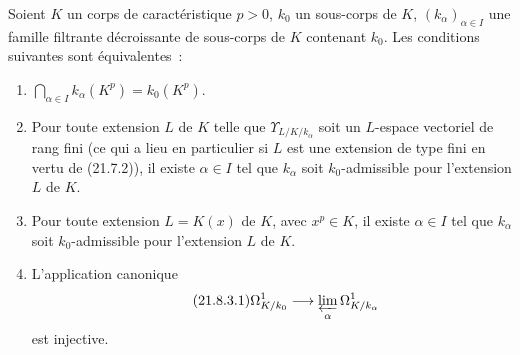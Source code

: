 \begin{theorem}[21.8.3]
\label{0.21.8.3-fr}
Soient $K$ un corps de caractéristique $p>0$, $k_0$ un sous-corps de $K$,
$(k_\alpha)_{\alpha\in I}$ une famille filtrante décroissante de sous-corps
de $K$ contenant $k_0$. Les conditions suivantes sont équivalentes~:
\begin{enumerate}
  \item[\rm a)] $\bigcap_{\alpha\in I}k_\alpha(K^p)=k_0(K^p)$.
  \item[\rm b)] Pour toute extension $L$ de $K$ telle que
  $\Upsilon_{L/K/k_\alpha}$ soit un $L$-espace vectoriel de rang fini
  (ce qui a lieu en particulier si $L$ est une extension de type fini en
  vertu de (21.7.2)), il existe $\alpha\in I$ tel que $k_\alpha$ soit
  $k_0$-admissible pour l'extension $L$ de $K$.
  \item[\rm b$'$)] Pour toute extension $L=K(x)$ de $K$, avec $x^p\in K$,
  il existe $\alpha\in I$ tel que $k_\alpha$ soit $k_0$-admissible pour
  l'extension $L$ de $K$.
  \item[\rm c)] L'application canonique
\begin{equation}
\tag{21.8.3.1}
\label{0.21.8.3.1-fr}
\Omega^1_{K/k_0}\longrightarrow\varprojlim_{\alpha}\Omega^1_{K/k_\alpha}
\end{equation}
est injective.
\end{enumerate}
\end{theorem}


